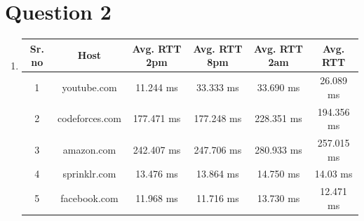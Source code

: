 \documentclass[a4paper,11pt]{article}
\begin{document}
\section*{Question 2}
\begin{enumerate}[itemsep=-3pt,label=(\alph*)]
	\item 
\begin{tabular}{|c|c|c|c|c|c|}
	\hline
	\rowcolor[RGB]{0, 145, 255}
	\textbf{Sr. no}&\textbf{Host} &\textbf{Avg. RTT 2pm} & \textbf{Avg. RTT 8pm}\hspace{0.1mm} & \textbf{Avg. RTT 2am}&  \textbf{Avg. RTT} \\
	\hline
	\rowcolor[RGB]{230, 242, 255}
	1&youtube.com & 11.244 ms & 33.333 ms &33.690 ms&26.089 ms
	\\ \hline
	
	\rowcolor[RGB]{0, 247, 255}
	2&codeforces.com & 177.471 ms & 177.248 ms &228.351 ms &194.356 ms
	\\ \hline
	
	\rowcolor[RGB]{230, 242, 255}
	3&amazon.com & 242.407 ms & 247.706 ms &280.933 ms &257.015 ms
	\\ \hline
	
	\rowcolor[RGB]{0, 247, 255}
	4&sprinklr.com & 13.476 ms & 13.864 ms &14.750 ms&14.03 ms
	\\ \hline
	
	\rowcolor[RGB]{230, 242, 255}
	5&facebook.com & 11.968 ms & 11.716 ms &13.730 ms&12.471 ms
	\\ \hline
	

\end{tabular}
\end{enumerate}
\end{document}

